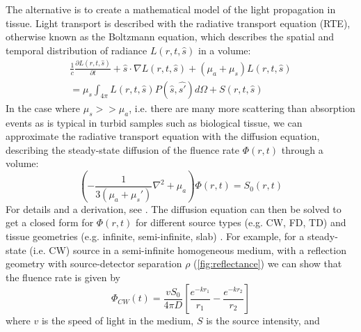 The alternative is to create a mathematical model of the light propagation in tissue. Light transport is described with the radiative transport equation (RTE), otherwise known as the Boltzmann equation, which describes the spatial and temporal distribution of radiance $L(r,t,\hat{s})$ in a volume:
\begin{multline}\label{eq:RTE}
\frac{1}{c}\frac{\partial L(r,t,\hat{s})}{\partial t} + \hat{s}\cdot\nabla L(r,t,\hat{s}) + (\mu_a + \mu_s)L(r,t,\hat{s}) \\
=\mu_s\int_{4\pi}L(r,t,\hat{s})P(\hat{s},\hat{s'})d\Omega + S(r,t,\hat{s})
\end{multline}
In the case where $\mu_s >> \mu_a$, i.e. there are many more scattering than absorption events as is typical in turbid samples such as biological tissue, we can approximate the radiative transport equation with the diffusion equation, describing the steady-state diffusion of the fluence rate $\Phi(r,t)$ through a volume:
\begin{equation}\label{eq:RTE_diffusion}
\left(-\frac{1}{3(\mu_a+\mu_s')}\nabla^2 + \mu_a\right)\Phi(r,t) = S_0(r,t)
\end{equation}
For details and a derivation, see \cite[ch. 3]{Madsen2013}. The diffusion equation can then be solved to get a closed form for $\Phi(r,t)$ for different source types (e.g. CW, FD, TD) and tissue geometries (e.g. infinite, semi-infinite, slab) \cite{Patterson1989, Farrell1992, Fantini1994, Kienle1997}. For example, for a steady-state (i.e. CW) source in a semi-infinite homogeneous medium, with a reflection geometry with source-detector separation $\rho$ (\autoref{fig:reflectance}) we can show that the fluence rate is given by
\begin{equation} \label{eq:flux_CW}
\Phi_{CW}(t) = \frac{vS_0}{4\pi D}
    \left[
        \frac{ e^{-kr_1} }{ r_1 }
       -\frac{ e^{-kr_2} }{ r_2 }
    \right]
\end{equation}
where $v$ is the speed of light in the medium, $S$ is the source intensity, and 


